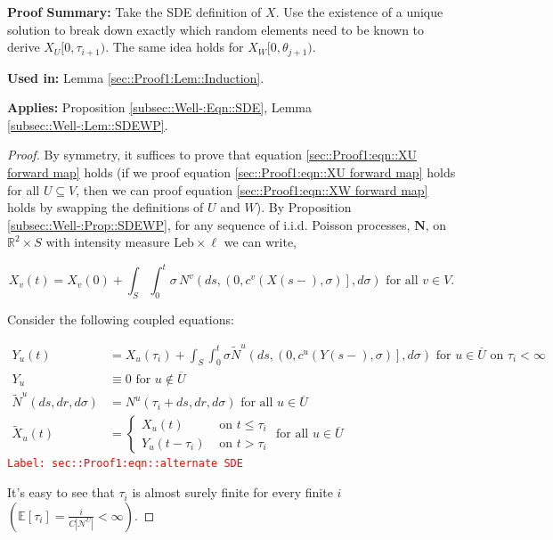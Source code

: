 \documentclass[12pt]{article}
\newcommand{\mb}{\mathbb}
\newcommand{\mc}{\mathcal}
\newcommand{\ov}{\overline}
\newcommand{\te}{\text}
\newcommand{\tr}{\textcolor{red}}
\newcommand{\labe}[1]{\tr{\texttt{Label: #1}}}
\newcommand{\pfsum}{\textbf{Proof Summary: }}
\newcommand{\usein}{\textbf{Used in: }}
\newcommand{\app}{\textbf{Applies: }}
\newcommand{\ex}[1]{\mb{E}\left[#1\right]}			%
\renewcommand{\v}{v}							%
\newcommand{\vv}{u}								%
\renewcommand{\U}{U}							%
\newcommand{\UU}{W}								%
\renewcommand{\S}{S}							%
\newcommand{\s}{\sigma}							%
\renewcommand{\t}{t}							%
\renewcommand{\tt}{s}							%
\newcommand{\X}{X}								%
\newcommand{\IGr}{c}							%
\newcommand{\neigh}{\mc{N}}						%
\newcommand{\vind}[1]{^{#1}}					%
\newcommand{\cind}[1]{_{#1}}					%
\newcommand{\cl}{\ov}							%
\newcommand{\tp}[1]{(#1)}						%
\newcommand{\tip}[1]{#1}						%
\newcommand{\const}{C}							%
\newcommand{\poisses}{\mathbf{N}}				%
\newcommand{\poiss}{N}							%
\newcommand{\leb}{\te{Leb}}						%
\newcommand{\Sm}{\ell}							%
\renewcommand{\r}{r}							%
\newcommand{\alt}[1]{\widetilde{#1}}			%
\newcommand{\indx}[1]{_{#1}}					%
\newcommand{\XX}{Y}								%
\newcommand{\rt}{\tau}							%
\newcommand{\rtt}{\theta}						%
\begin{document}
\pfsum Take the SDE definition of \(\X\). Use the existence of a unique solution to break down exactly which random elements need to be known to derive \(\X\cind{\U}\tip{[0,\rt\indx{i+1})}\). The same idea holds for \(\X\cind{\UU}\tip{[0,\rtt\indx{j+1})}\).

\usein Lemma \ref{sec::Proof1:Lem::Induction}.

\app Proposition \ref{subsec::Well-:Eqn::SDE}, Lemma \ref{subsec::Well-:Lem::SDEWP}.

\begin{proof}
By symmetry, it suffices to prove that equation \ref{sec::Proof1:eqn::XU forward map} holds (if we proof equation \eqref{sec::Proof1:eqn::XU forward map} holds for all \(\U \subseteq V\), then we can proof equation \eqref{sec::Proof1:eqn::XW forward map} holds by swapping the definitions of \(\U\) and \(\UU\)). By Proposition \ref{subsec::Well-:Prop::SDEWP}, for any sequence of i.i.d. Poisson processes, \(\poisses\), on \(\mb{R}^2\times \S\) with intensity measure \(\leb\times\Sm\) we can write,

\[\X\cind{\v}\tp{\t} = \X\cind{\v}\tp{0} + \int_\S\int_0^\t \s\,\poiss\vind{\v}\left(d\tt,\left(0,\IGr\vind{\v}(\X\tp{\tt-},\s)\right],d\s\right)\te{ for all } \v\in V.\]

Consider the following coupled equations:

\begin{align}
\XX\cind{\vv}\tp{\t} &= \X\cind{\vv}\tp{\rt\indx{i}} + \int_\S\int_0^\t \s\alt{\poiss}\vind{\vv}\left(d\tt,\left(0,\IGr\vind{\vv}(\XX\tp{\tt-},\s)\right],d\s\right)\te{ for } \vv \in \cl{\U} \te{ on } \rt\indx{i} < \infty \label{sec::Proof1:eqn::alternate SDE}\\
\XX\cind{\vv} &\equiv 0\te{ for } \vv\notin \cl{\U}\nonumber\\
\alt{\poiss}\vind{\vv}(d\tt,d\r,d\s) &= \poiss\vind{\vv}(\rt\indx{i} + d\tt,d\r,d\s) \te{ for all }\vv\in \cl{\U}\nonumber\\
\alt{\X}\cind{\vv}\tp{\t} &= \begin{cases}
\X\cind{\vv}\tp{\t} &\te{ on } \t \leq \rt\indx{i}\\
\XX\cind{\vv}\tp{\t - \rt\indx{i}} &\te{ on } \t > \rt\indx{i}
\end{cases} \te{ for all } \vv\in \cl{\U} \nonumber
\end{align}
\labe{sec::Proof1:eqn::alternate SDE}

It's easy to see that \(\rt\indx{i}\) is almost surely finite for every finite \(i\) \(\left(\ex{\rt\indx{i}} = \frac{i}{\const|\neigh\vind{\U}|} < \infty\right)\). 


\end{proof}
\end{document}
